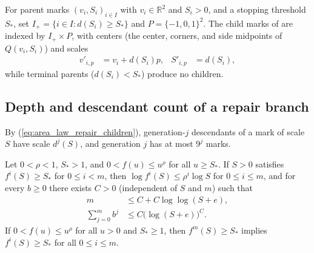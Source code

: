 \begin{definition}
    \label{def:area_law_repair_children}
    \leanok
    For parent marks $(v_i,S_i)_{i\in I}$ with $v_i\in\mathbb R^2$ and
    $S_i>0$, and a stopping threshold $S_*$, set
    $I_+=\{i\in I:d(S_i)\ge S_*\}$ and $P=\{-1,0,1\}^2$. The child marks
    of \cite[Section~11]{OpenAI2026AreaLaw} are indexed by $I_+\times P$,
    with centers (the center, corners, and side midpoints of $Q(v_i,S_i)$)
    and scales
    \begin{align}
        v'_{i,p} & =v_i+d(S_i)p, & S'_{i,p} & =d(S_i),
        \label{eq:area_law_repair_children}
    \end{align}
    while terminal parents ($d(S_i)<S_*$) produce no children.
\end{definition}

\subsection{Depth and descendant count of a repair branch}
\label{sec:area_law_repair_depth}

By (\ref{eq:area_law_repair_children}), generation-$j$ descendants of a mark
of scale $S$ have scale $d^{j}(S)$, and generation $j$ has at most $9^j$ marks.

\begin{lemma}
    \label{thm:area_law_power_recursion_depth}
    \leanok
    Let $0<\rho<1$, $S_*>1$, and $0<f(u)\le u^{\rho}$ for all $u\ge S_*$. If
    $S>0$ satisfies $f^{i}(S)\ge S_*$ for $0\le i<m$, then
    $\log f^{i}(S)\le\rho^{i}\log S$ for $0\le i\le m$, and for every $b\ge0$
    there exists $C>0$ (independent of $S$ and $m$) such that
    \begin{align}
        m                   & \le C+C\log\log(S+e),
        \label{eq:area_law_power_recursion_depth}             \\
        \sum_{j=0}^{m}b^{j} & \le C\bigl(\log(S+e)\bigr)^{C}.
        \label{eq:area_law_power_recursion_sum}
    \end{align}
    If $0<f(u)\le u^{\rho}$ for all $u>0$ and $S_*\ge1$, then
    $f^{m}(S)\ge S_*$ implies $f^{i}(S)\ge S_*$ for all $0\le i\le m$.
\end{lemma}

